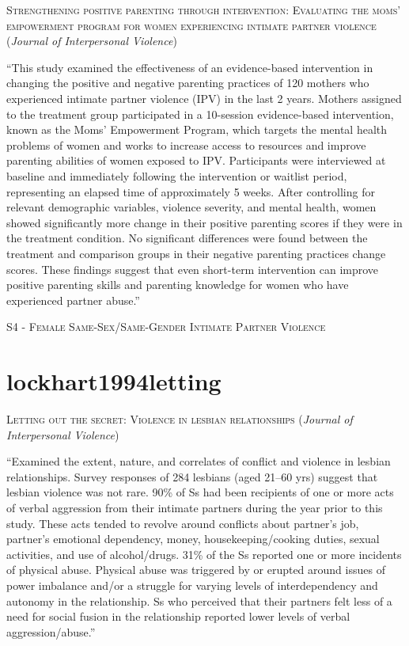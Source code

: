 \documentclass[]{tufte-handout}
\begin{document}
\textsc{\large{Strengthening positive parenting through intervention: Evaluating the moms' empowerment program for women experiencing intimate partner violence}}
(\emph{Journal of Interpersonal Violence})

``This study examined the effectiveness of an evidence-based
intervention in changing the positive and negative parenting practices
of 120 mothers who experienced intimate partner violence (IPV) in the
last 2 years. Mothers assigned to the treatment group participated in a
10-session evidence-based intervention, known as the Moms' Empowerment
Program, which targets the mental health problems of women and works to
increase access to resources and improve parenting abilities of women
exposed to IPV. Participants were interviewed at baseline and
immediately following the intervention or waitlist period, representing
an elapsed time of approximately 5 weeks. After controlling for relevant
demographic variables, violence severity, and mental health, women
showed significantly more change in their positive parenting scores if
they were in the treatment condition. No significant differences were
found between the treatment and comparison groups in their negative
parenting practices change scores. These findings suggest that even
short-term intervention can improve positive parenting skills and
parenting knowledge for women who have experienced partner abuse.''

\newpage

\centerline{\Large{\textsc{S4 - Female Same-Sex/Same-Gender Intimate Partner Violence}}}

\section{\texorpdfstring{\textcolor[HTML]{5b0057}{lockhart1994letting}}{}}\label{section-23}

\textsc{\large{Letting out the secret: Violence in lesbian relationships}}
(\emph{Journal of Interpersonal Violence})

``Examined the extent, nature, and correlates of conflict and violence
in lesbian relationships. Survey responses of 284 lesbians (aged 21--60
yrs) suggest that lesbian violence was not rare. 90\% of Ss had been
recipients of one or more acts of verbal aggression from their intimate
partners during the year prior to this study. These acts tended to
revolve around conflicts about partner's job, partner's emotional
dependency, money, housekeeping/cooking duties, sexual activities, and
use of alcohol/drugs. 31\% of the Ss reported one or more incidents of
physical abuse. Physical abuse was triggered by or erupted around issues
of power imbalance and/or a struggle for varying levels of
interdependency and autonomy in the relationship. Ss who perceived that
their partners felt less of a need for social fusion in the relationship
reported lower levels of verbal aggression/abuse.''
\end{document}
